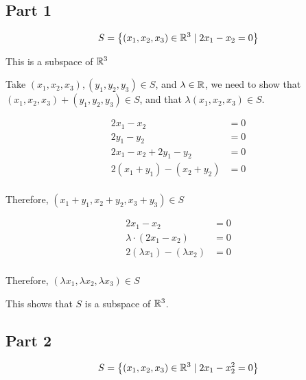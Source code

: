 \documentclass[12pt]{article} %
\begin{document}
\begin{homeworkProblem}

    \subsection*{Part 1}
    $$
        S = \left\{(x_1, x_2, x_3) \in \mathbb{R}^3 \mid 2x_1 - x_2 = 0\right\}
    $$

    This is a subspace of $\mathbb{R}^3$

    Take $(x_1, x_2, x_3), (y_1, y_2, y_3) \in S$, and $\lambda \in \mathbb{R}$, we need to show that $(x_1, x_2, x_3) + (y_1, y_2, y_3) \in S$, and that $\lambda (x_1, x_2, x_3) \in S$.


    \begin{align*}
        2x_1 - x_2                  & = 0 \\
        2y_1 - y_2                  & = 0 \\
        2x_1 - x_2 + 2y_1 - y_2     & = 0 \\
        2 (x_1 + y_1) - (x_2 + y_2) & = 0 \\
    \end{align*}

    Therefore, $(x_1 + y_1, x_2 + y_2, x_3 + y_3) \in S$

    \begin{align*}
        2x_1 - x_2                       & = 0 \\
        \lambda \cdot (2x_1 - x_2)       & = 0 \\
        2( \lambda x_1 ) - (\lambda x_2) & = 0 \\
    \end{align*}

    Therefore, $(\lambda x_1, \lambda x_2, \lambda x_3) \in S$

    This shows that $S$ is a subspace of $\mathbb{R}^3$.

    \subsection*{Part 2}
    $$
        S = \left\{(x_1, x_2, x_3) \in \mathbb{R}^3 \mid 2x_1 - x_2^2 = 0\right\}
    $$


\end{homeworkProblem}
\end{document}
